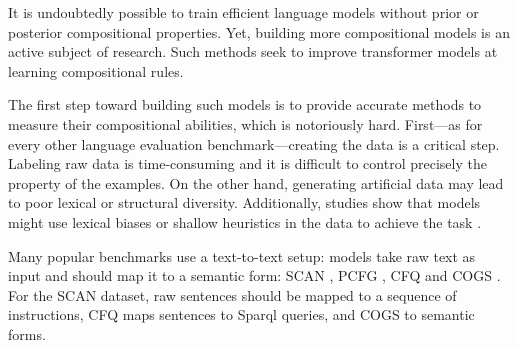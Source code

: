 It is undoubtedly possible to train efficient language models without prior or posterior compositional properties. Yet, building more compositional models is an active subject of research. Such methods seek to improve transformer models at learning compositional rules.

The first step toward building such models is to provide accurate methods to measure their compositional abilities, which is notoriously hard. First—as for every other language evaluation benchmark—creating the data is a critical step. Labeling raw data is time-consuming and it is difficult to control precisely the property of the examples. On the other hand, generating artificial data may lead to poor lexical or structural diversity. Additionally, studies show that models might use lexical biases or shallow heuristics in the data to achieve the task \parencite{linzen_18}. 

Many popular benchmarks use a text-to-text setup: models take raw text as input and should map it to a semantic form: SCAN \parencite{lake_18}, PCFG \parencite{hupkes_20}, CFQ \parencite{keysers_20} and COGS \parencite{kim_20}. For the SCAN dataset, raw sentences should be mapped to a sequence of instructions, CFQ maps sentences to Sparql queries, and COGS to semantic forms.

